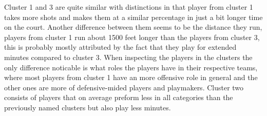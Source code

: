 \documentclass{article}
\begin{document}
\begin{table}[h]
\centering
{}
\caption{Cluster lables and typical players} 
\end{table}

Cluster 1 and 3 are quite similar with distinctions in that player from cluster 1 takes more shots and makes them at a similar percentage in just a bit longer time on the court. Another  difference between them seems to be the distance they run, players from cluster 1 run about 1500 feet longer than the players from cluster 3, this is probably mostly attributed by the fact that they play for extended minutes compared to cluster 3. When inspecting the players in the clusters the only difference noticable is what roles the players have in their respective teams, where most players from cluster 1 have an more offensive role in general and the other ones are more of defensive-mided players and playmakers. Cluster two consists of players that on average preform less in all categories than the previously named clusters but also play less minutes.
\end{document}
